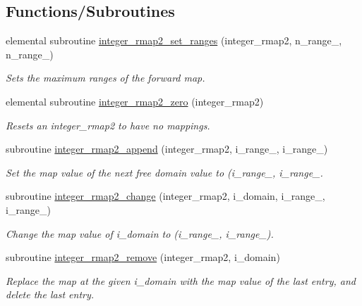 \subsection*{Functions/\+Subroutines}
\begin{DoxyCompactItemize}
\item 
elemental subroutine \mbox{\hyperlink{namespacepmc__integer__rmap2_aa6b57f76f7da55c1c3e6537737bfa221}{integer\+\_\+rmap2\+\_\+set\+\_\+ranges}} (integer\+\_\+rmap2, n\+\_\+range\+\_, n\+\_\+range\+\_)
\begin{DoxyCompactList}\small\item\em Sets the maximum ranges of the forward map. \end{DoxyCompactList}\item 
elemental subroutine \mbox{\hyperlink{namespacepmc__integer__rmap2_a958ce14f01354b01adabc55480c620ab}{integer\+\_\+rmap2\+\_\+zero}} (integer\+\_\+rmap2)
\begin{DoxyCompactList}\small\item\em Resets an integer\+\_\+rmap2 to have no mappings. \end{DoxyCompactList}\item 
subroutine \mbox{\hyperlink{namespacepmc__integer__rmap2_ae9b0fce5017e7fe869e8e408c730f4d3}{integer\+\_\+rmap2\+\_\+append}} (integer\+\_\+rmap2, i\+\_\+range\+\_, i\+\_\+range\+\_)
\begin{DoxyCompactList}\small\item\em Set the map value of the next free domain value to {\ttfamily (i\+\_\+range\+\_, i\+\_\+range\+\_}. \end{DoxyCompactList}\item 
subroutine \mbox{\hyperlink{namespacepmc__integer__rmap2_aae3247ef6730522e692d01c18fc5587d}{integer\+\_\+rmap2\+\_\+change}} (integer\+\_\+rmap2, i\+\_\+domain, i\+\_\+range\+\_, i\+\_\+range\+\_)
\begin{DoxyCompactList}\small\item\em Change the map value of {\ttfamily i\+\_\+domain} to {\ttfamily (i\+\_\+range\+\_, i\+\_\+range\+\_)}. \end{DoxyCompactList}\item 
subroutine \mbox{\hyperlink{namespacepmc__integer__rmap2_a3f44399fe3fa2f0aec68f32746fa4ccc}{integer\+\_\+rmap2\+\_\+remove}} (integer\+\_\+rmap2, i\+\_\+domain)
\begin{DoxyCompactList}\small\item\em Replace the map at the given {\ttfamily i\+\_\+domain} with the map value of the last entry, and delete the last entry. \end{DoxyCompactList}\item 

\end{DoxyCompactItemize}
